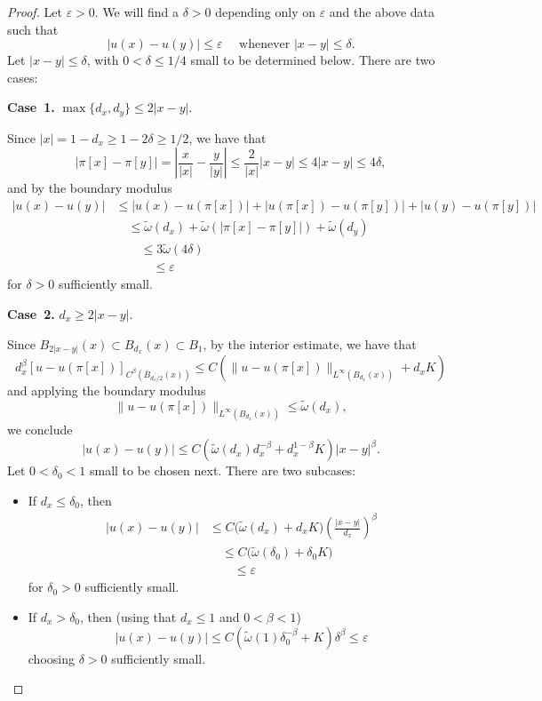 \documentclass[letter,11pt]{amsart}
\newcommand{\vep}{\varepsilon}
\theoremstyle{definition}
\numberwithin{equation}{section}
\begin{document}
\begin{proof}
Let $\vep > 0$.
We will find a $\delta > 0$ depending only on $\vep$ and the above data such that
\[
|u(x) - u(y)| \leq \vep \quad \text{ whenever } |x- y| \leq \delta.
\]
Let $|x- y| \leq \delta$, with $0 < \delta \leq 1/4$ small to be determined below.
There are two cases:

\medskip

\noindent
\textbf{Case~1.} $\max\{d_x, d_y\} \leq 2 |x-y|$.

\medskip

Since $|x| = 1- d_x \geq 1 - 2 \delta \geq 1/2$, we have that
\[
\big|\pi[x] - \pi[y]\big| = 
\left|\frac{x}{|x|} - \frac{y}{|y|}\right| 
\leq \frac{2}{|x|} |x-y|
\leq 4 |x-y| \leq 4 \delta,
\]
and by the boundary modulus
\[
\begin{split}
|u(x) - u(y)| &\leq 
|u(x) - u(\pi[x])| + |u(\pi[x]) - u(\pi[y])| +|u(y) - u(\pi[y])| \\
& \quad \leq 
\widetilde{\omega}(d_x) + \widetilde{\omega}(|\pi[x]-\pi[y]|) + \widetilde{\omega}(d_y)\\
& \qquad \leq 
3 \widetilde{\omega}(4 \delta)\\
& \qquad \quad \leq \vep
\end{split}
\]
for $\delta > 0$ sufficiently small.

\medskip

\noindent
\textbf{Case~2.} $d_x \geq 2 |x-y|$.

\medskip

Since $B_{2|x-y|}(x) \subset B_{d_x}(x) \subset B_1$, by the interior estimate, we have that
\[
d_x^{\beta} [u- u(\pi[x])]_{C^{\beta}(\overline{B}_{d_x/2}(x))}
\leq C \left( 
\|u - u(\pi[x])\|_{L^{\infty}(B_{d_x}(x))}
+ d_x K
\right)
\]
and applying the boundary modulus
\[
\|u - u(\pi[x])\|_{L^{\infty}(B_{d_x}(x))} \leq \widetilde{\omega}(d_x),
\]
we conclude
\[
|u(x)-u(y)| \leq
C \left( \widetilde{\omega}(d_x) d_x^{-\beta} + d_x^{1-\beta} K \right) |x-y|^{\beta}.
\]
Let $0 < \delta_0 < 1$ small to be chosen next.
There are two subcases:
\begin{itemize}
\item
If $d_x \leq \delta_0$, then
\[
\begin{split}
|u(x) - u(y)| & \leq C \Big( \widetilde{\omega}(d_x) + d_x K
\Big)
\left(\frac{|x-y|}{d_x}\right)^{\beta}
\\
& \quad \leq C \Big( \widetilde{\omega}(\delta_0) +  \delta_0 K  \Big)\\
& \qquad \leq \vep
\end{split}
\]
for $\delta_0 > 0$ sufficiently small.
\item If $d_x > \delta_0$, then
(using that $d_x \leq 1$ and $0 < \beta < 1$)
\[
|u(x)-u(y)| 
\leq C \left( \widetilde{\omega}(1) \delta_0^{-\beta} + K \right) \delta^{\beta}
\leq \vep
\]
choosing $\delta > 0$ sufficiently small.
\end{itemize}
\end{proof}
\end{document}
